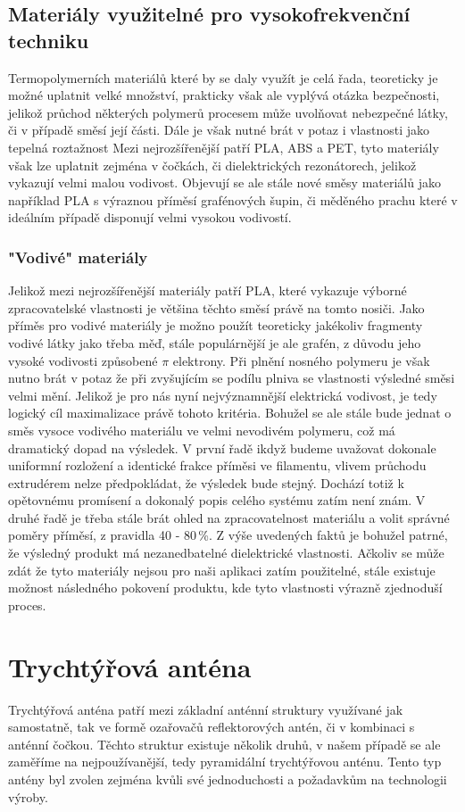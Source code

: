 \subsection{Materiály využitelné pro vysokofrekvenční techniku}
Termopolymerních materiálů které by se daly využít je celá řada, teoreticky je možné uplatnit velké množství, prakticky však ale vyplývá otázka bezpečnosti, jelikož průchod některých polymerů procesem může uvolňovat nebezpečné látky, či v případě směsí její části. Dále je však nutné brát v potaz i vlastnosti jako tepelná roztažnost 
Mezi nejrozšířenější patří PLA, ABS a PET, tyto materiály však lze uplatnit zejména v čočkách, či dielektrických rezonátorech, jelikož vykazují velmi malou vodivost. Objevují se ale stále nové směsy materiálů jako například PLA s výraznou příměsí grafénových šupin, či měděného prachu které v ideálním případě disponují velmi vysokou vodivostí.

\subsubsection{"Vodivé" materiály}
Jelikož mezi nejrozšířenější materiály patří PLA, které vykazuje výborné zpracovatelské vlastnosti je většina těchto směsí právě na tomto nosiči.
Jako příměs pro vodivé materiály je možno použít teoreticky jakékoliv fragmenty vodivé látky jako třeba měď, stále populárnější je ale grafén, z důvodu jeho vysoké vodivosti způsobené $\pi$ elektrony. Při plnění nosného polymeru je však nutno brát v potaz že při zvyšujícím se podílu plniva se vlastnosti výsledné směsi velmi mění.
Jelikož je pro nás nyní nejvýznamnější elektrická vodivost, je tedy logický cíl maximalizace právě tohoto kritéria. Bohužel se ale stále bude jednat o směs vysoce vodivého materiálu ve velmi nevodivém polymeru, což má dramatický dopad na výsledek. V první řadě ikdyž budeme uvažovat dokonale uniformní rozložení a identické frakce příměsi ve filamentu, vlivem průchodu extrudérem nelze předpokládat, že výsledek bude stejný. Dochází totiž k opětovnému promísení a dokonalý popis celého systému zatím není znám. V druhé řadě je třeba stále brát ohled na zpracovatelnost materiálu a volit správné poměry příměsí, z pravidla 40 - 80\,\%\cite{Dolecek}. Z výše uvedených faktů je bohužel patrné, že výsledný produkt má nezanedbatelné dielektrické vlastnosti.
Ačkoliv se může zdát že tyto materiály nejsou pro naši aplikaci zatím použitelné, stále existuje možnost následného pokovení produktu, kde tyto vlastnosti výrazně zjednoduší proces.

\section{Trychtýřová anténa}
Trychtýřová anténa patří mezi základní anténní struktury využívané jak samostatně, tak ve formě ozařovačů reflektorových antén, či v kombinaci s anténní čočkou. Těchto struktur existuje několik druhů, v našem případě se ale zaměříme na nejpoužívanější, tedy pyramidální trychtýřovou anténu.
Tento typ antény byl zvolen zejména kvůli své jednoduchosti a požadavkům na technologii výroby.

